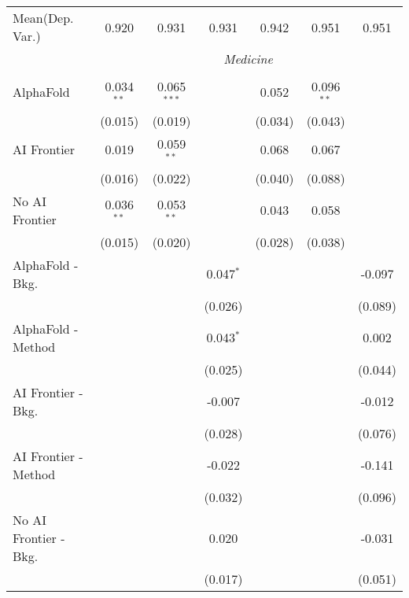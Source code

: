 \begin{tabular}{lcccccc}
Mean(Dep. Var.) & 0.920 & 0.931 & 0.931 & 0.942 & 0.951 & 0.951 \\
 & \multicolumn{6}{c}{\textit{Medicine}} \\ \\
   AlphaFold               & 0.034$^{**}$ & 0.065$^{***}$ &               & 0.052   & 0.096$^{**}$ &   \\   
                           & (0.015)      & (0.019)       &               & (0.034) & (0.043)      &   \\   
   AI Frontier             & 0.019        & 0.059$^{**}$  &               & 0.068   & 0.067        &   \\   
                           & (0.016)      & (0.022)       &               & (0.040) & (0.088)      &   \\   
   No AI Frontier          & 0.036$^{**}$ & 0.053$^{**}$  &               & 0.043   & 0.058        &   \\   
                           & (0.015)      & (0.020)       &               & (0.028) & (0.038)      &   \\   
   AlphaFold - Bkg.        &              &               & 0.047$^{*}$   &         &              & -0.097\\   
                           &              &               & (0.026)       &         &              & (0.089)\\   
   AlphaFold - Method      &              &               & 0.043$^{*}$   &         &              & 0.002\\   
                           &              &               & (0.025)       &         &              & (0.044)\\   
   AI Frontier - Bkg.      &              &               & -0.007        &         &              & -0.012\\   
                           &              &               & (0.028)       &         &              & (0.076)\\   
   AI Frontier - Method    &              &               & -0.022        &         &              & -0.141\\   
                           &              &               & (0.032)       &         &              & (0.096)\\   
   No AI Frontier - Bkg.   &              &               & 0.020         &         &              & -0.031\\   
                           &              &               & (0.017)       &         &              & (0.051)\\   

\end{tabular}
